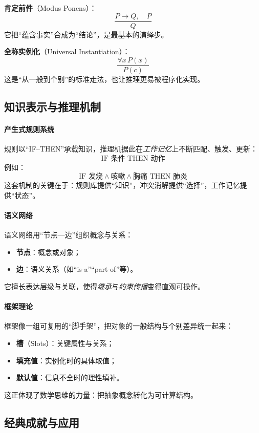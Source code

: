 \textbf{肯定前件}（Modus Ponens）：
$$\frac{P \rightarrow Q, \quad P}{Q}$$
它把“蕴含事实”合成为“结论”，是最基本的演绎步。

\textbf{全称实例化}（Universal Instantiation）：
$$\frac{\forall x \, P(x)}{P(c)}$$
这是“从一般到个别”的标准走法，也让推理更易被程序化实现。

\subsection{知识表示与推理机制}

\paragraph{产生式规则系统}
规则以“IF–THEN”承载知识，推理机据此在\emph{工作记忆}上不断匹配、触发、更新：  
$$\text{IF } \text{条件} \text{ THEN } \text{动作}$$
例如：
$$\text{IF } \text{发烧} \land \text{咳嗽} \land \text{胸痛} \text{ THEN } \text{肺炎}$$
这套机制的关键在于：规则库提供“知识”，冲突消解提供“选择”，工作记忆提供“状态”。

\paragraph{语义网络}
语义网络用“节点—边”组织概念与关系：
\begin{itemize}
\item \textbf{节点}：概念或对象；
\item \textbf{边}：语义关系（如“is-a”“part-of”等）。
\end{itemize}
它擅长表达层级与关联，使得\emph{继承}与\emph{约束传播}变得直观可操作。

\paragraph{框架理论}
框架像一组可复用的“脚手架”，把对象的一般结构与个别差异统一起来：
\begin{itemize}
\item \textbf{槽}（Slots）：关键属性与关系；
\item \textbf{填充值}：实例化时的具体取值；
\item \textbf{默认值}：信息不全时的理性填补。
\end{itemize}
这正体现了数学思维的力量：把抽象概念转化为可计算结构。

\subsection{经典成就与应用}

